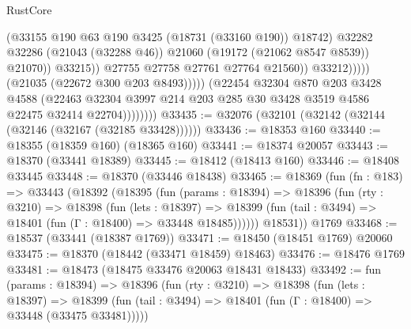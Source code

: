 \begin{lexlean}{RustCore}
\begin{coremodule}
                                            (@33155
                                              @190
                                              @63
                                              @190
                                              @3425
                                              (@18731 (@33160 @190))
                                              @18742)
                                            @32282
                                            @32286
                                            (@21043 (@32288 @46))
                                            @21060
                                            (@19172 (@21062 @8547 @8539))
                                            @21070))
                                        @33215))
                                    @27755
                                    @27758
                                    @27761
                                    @27764
                                    @21560))
                                @33212)))))
                      (@21035 (@22672 @300 @203 @8493)))))
                (@22454
                  @32304
                  @870
                  @203
                  @3428
                  @4588
                  (@22463
                    @32304
                    @3997
                    @214
                    @203
                    @285
                    @30
                    @3428
                    @3519
                    @4586
                    @22475
                    @32414
                    @22704))))))))
@33435 := @32076 (@32101 (@32142 (@32144 (@32146 (@32167 (@32185 @33428))))))
@33436 := @18353 @160
@33440 := @18355 (@18359 @160) (@18365 @160)
@33441 := @18374 @20057
@33443 := @18370 (@33441 @18389)
@33445 := @18412 (@18413 @160)
@33446 := @18408 @33445
@33448 := @18370 (@33446 @18438)
@33465 := @18369
    (fun (fn : @183) =>
    @33443
      (@18392
        (@18395
          (fun (params : @18394) =>
          @18396
            (fun (rty : @3210) =>
            @18398
              (fun (lets : @18397) =>
              @18399 (fun (tail : @3494) => @18401 (fun (Γ : @18400) => @33448 @18485))))))
        @18531))
    @1769
@33468 := @18537 (@33441 (@18387 @1769))
@33471 := @18450 (@18451 @1769) @20060
@33475 := @18370 (@18442 (@33471 @18459) @18463)
@33476 := @18476 @1769
@33481 := @18473 (@18475 @33476 @20063 @18431 @18433)
@33492 := fun (params : @18394) =>
  @18396
    (fun (rty : @3210) =>
    @18398
      (fun (lets : @18397) =>
      @18399 (fun (tail : @3494) => @18401 (fun (Γ : @18400) => @33448 (@33475 @33481)))))

\end{coremodule}
\end{lexlean}
